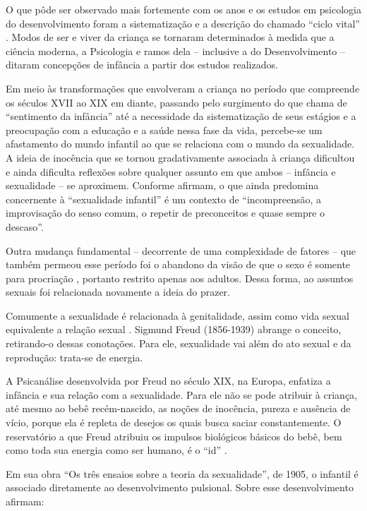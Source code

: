 O que pôde ser observado mais fortemente com os anos e os estudos em psicologia do desenvolvimento foram a sistematização e a descrição do chamado ``ciclo vital'' \cite[p. 20]{CASTRO1998}. Modos de ser e viver da criança se tornaram determinados à medida que a ciência moderna, a Psicologia e ramos dela -- inclusive a do Desenvolvimento -- ditaram concepções de infância a partir dos estudos realizados.

Em meio às transformações que envolveram a criança no período que compreende os séculos XVII ao XIX em diante, passando pelo surgimento do que  chama de ``sentimento da infância'' até a necessidade da sistematização de seus estágios e a preocupação com a educação e a saúde nessa fase da vida, percebe-se um afastamento do mundo infantil ao que se relaciona com o mundo da sexualidade. A ideia de inocência que se tornou gradativamente associada à criança dificultou e ainda dificulta reflexões sobre qualquer assunto em que ambos -- infância e sexualidade -- se aproximem. Conforme  afirmam, o que ainda predomina concernente à ``sexualidade infantil'' é um contexto de ``incompreensão, a improvisação do senso comum, o repetir de preconceitos e quase sempre o descaso''.

Outra mudança fundamental -- decorrente de uma complexidade de fatores -- que também permeou esse período foi o abandono da visão de que o sexo é somente para procriação \cite[n.p.]{REZENDE2008}, portanto restrito apenas aos adultos. Dessa forma, ao assuntos sexuais foi relacionada novamente a ideia do prazer. 

Comumente a sexualidade é relacionada à genitalidade, assim como vida sexual equivalente a relação sexual \cite{BEARZOTI1994}. Sigmund Freud (1856-1939) abrange o conceito, retirando-o dessas conotações. Para ele, sexualidade vai além do ato sexual e da reprodução: trata-se de energia.

A Psicanálise desenvolvida por Freud no século XIX, na Europa, enfatiza a infância e sua relação com a sexualidade. Para ele não se pode atribuir à criança, até mesmo ao bebê recém-nascido, as noções de inocência, pureza e ausência de vício, porque ela é repleta de desejos os quais busca saciar constantemente. O reservatório a que Freud atribuiu os impulsos biológicos básicos do bebê, bem como toda sua energia como ser humano, é o ``id'' \cite{GALLATIN1978}. 

Em sua obra ``Os três ensaios sobre a teoria da sexualidade'', de 1905, o infantil é associado diretamente ao desenvolvimento pulsional. Sobre esse desenvolvimento  afirmam: 

